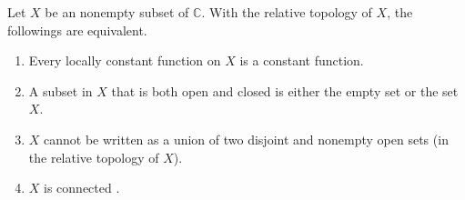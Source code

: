 \begin{svgraybox}
	\begin{theorem} \label{thm:connected_set}
	Let $X$ be an nonempty subset of $\mathbb{C}$. With the relative topology of $X$, the followings are equivalent.
	\begin{enumerate}
		\item Every locally constant function on $X$ is a constant function.
		\item A subset in $X$ that is both open and closed is either the empty set or the set $X$.
		\item $X$ cannot be written as a union of two disjoint and nonempty open sets (in the relative topology of $X$).
		\item $X$ is connected .
	\end{enumerate}
	\end{theorem}
\end{svgraybox}


